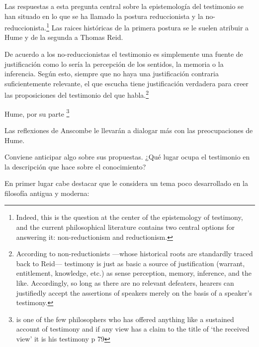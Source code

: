 Las respuestas a esta pregunta central sobre la epistemología del testimonio se
han situado en lo que se ha llamado la postura reduccionista y la
no-reduccionista.\footnote{Indeed, this is the question at the center of the
  epistemology of testimony, and the current philosophical literature contains
  two central options for answering it: non-reductionism and reductionism.} Las
raices históricas de la primera postura se le suelen atribuir a Hume y de la
segunda a Thomas Reid.

De acuerdo a los no-reduccionistas el testimonio es simplemente una fuente de
justificación como lo sería la percepción de los sentidos, la memoria o la
inferencia. Según esto, siempre que no haya una justificación contraria
suficientemente relevante, el que escucha tiene justificación verdadera para
creer las proposiciones del testimonio del que habla.\footnote{According to
  non-reductionists ---whose historical roots are standardly traced back to
  Reid--- testimony is just as basic a source of justification (warrant,
  entitlement, knowledge, etc.) as sense perception, memory, inference, and the
  like. Accordingly, so long as there are no relevant defeaters, hearers can
  justifiedly accept the assertions of speakers merely on the basis of a
  speaker's testimony.}

Hume, por su parte \footnote{is one of the few philosophers who has offered anything like
  a sustained account of testimony and if any view has a claim to the title of
  `the received view' it is his testimony p 79}


Las reflexiones de Anscombe le llevarán a dialogar más con las preocupaciones de
Hume.

Conviene anticipar algo sobre sus propuestas. ¿Qué lugar ocupa el
testimonio en la descripción que hace sobre el conocimiento?

En primer lugar cabe destacar que le considera un tema poco desarrollado en la
filosofía antigua y moderna:



